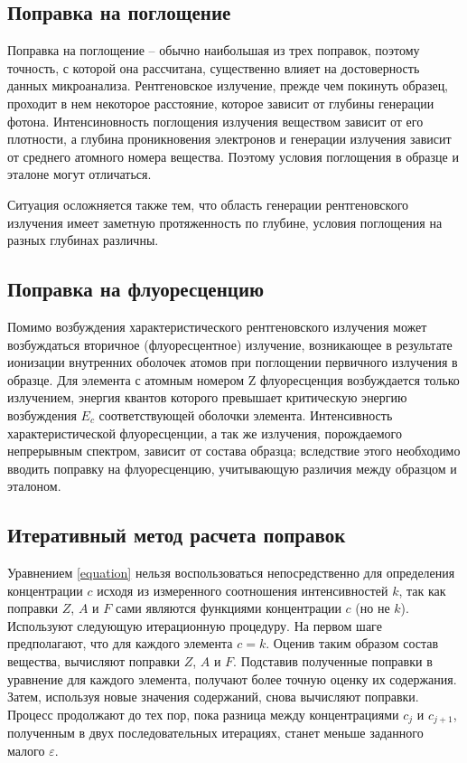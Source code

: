 \documentclass[14pt]{extarticle}
\begin{document}
\subsection*{Поправка на поглощение}

Поправка на поглощение -- обычно наибольшая из трех поправок, поэтому точность, с которой она рассчитана, существенно влияет на достоверность данных микроанализа. Рентгеновское излучение, прежде чем покинуть образец, проходит в нем некоторое расстояние, которое зависит от глубины генерации фотона. Интенсиновность поглощения излучения веществом зависит от его плотности, а глубина проникновения электронов и генерации излучения зависит от среднего атомного номера вещества. Поэтому условия поглощения в образце и эталоне могут отличаться. \par
Ситуация осложняется также тем, что область генерации рентгеновского излучения имеет заметную протяженность по глубине, условия поглощения на разных глубинах различны.

\subsection*{Поправка на флуоресценцию}
Помимо возбуждения характеристического рентгеновского излучения может возбуждаться вторичное (флуоресцентное) излучение, возникающее в результате ионизации внутренних оболочек атомов при поглощении первичного излучения в образце. Для элемента с атомным номером Z флуоресценция возбуждается только излучением, энергия квантов которого превышает критическую энергию возбуждения $E_c$ соответствующей оболочки элемента. Интенсивность характеристической флуоресценции, а так же излучения, порождаемого непрерывным спектром, зависит от состава образца; вследствие этого необходимо вводить поправку на флуоресценцию, учитывающую различия между образцом и эталоном.

\subsection*{Итеративный метод расчета поправок}
Уравнением \eqref{equation} нельзя воспользоваться непосредственно для определения концентрации $c$ исходя из измеренного соотношения интенсивностей $k$, так как поправки $Z$, $A$ и $F$ сами являются функциями концентрации $c$ (но не $k$). Используют следующую итерационную процедуру. На первом шаге предполагают, что для каждого элемента $c = k$. Оценив таким образом состав вещества, вычисляют поправки $Z$, $A$ и $F$. Подставив полученные поправки в уравнение для каждого элемента, получают более точную оценку их содержания. Затем, используя новые значения содержаний, снова вычисляют поправки. Процесс продолжают до тех пор, пока разница между концентрациями $c_j$ и $c_{j+1}$, полученным в двух последовательных итерациях, станет меньше заданного малого $\varepsilon$. 
\end{document}
